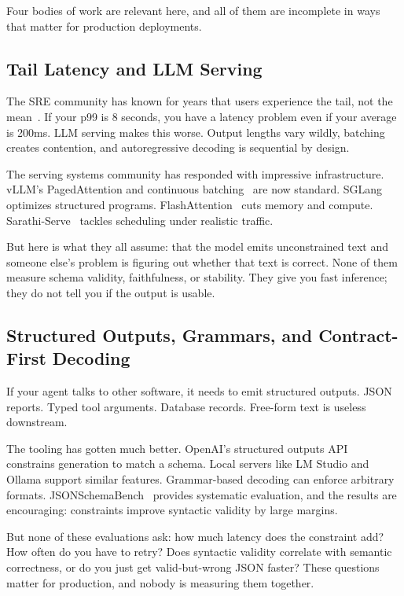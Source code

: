 \documentclass[11pt]{article}
\begin{document}
Four bodies of work are relevant here, and all of them are incomplete in ways that matter for production deployments.

\subsection{Tail Latency and LLM Serving}

The SRE community has known for years that users experience the tail, not the mean~\citep{dean2013tail}.
If your p99 is 8 seconds, you have a latency problem even if your average is 200ms.
LLM serving makes this worse.  Output lengths vary wildly, batching creates contention, and autoregressive decoding is sequential by design.

The serving systems community has responded with impressive infrastructure.
vLLM's PagedAttention and continuous batching~\citep{kwon2023vllm} are now standard.
SGLang~\citep{zheng2023sglang} optimizes structured programs.
FlashAttention~\citep{dao2023flashattention2} cuts memory and compute.
Sarathi-Serve~\citep{agrawal2024sarathi} tackles scheduling under realistic traffic.

But here is what they all assume: that the model emits unconstrained text and someone else's problem is figuring out whether that text is correct.
None of them measure schema validity, faithfulness, or stability.
They give you fast inference; they do not tell you if the output is usable.

\subsection{Structured Outputs, Grammars, and Contract-First Decoding}

If your agent talks to other software, it needs to emit structured outputs.
JSON reports.
Typed tool arguments.
Database records.
Free-form text is useless downstream.

The tooling has gotten much better.
OpenAI's structured outputs API~\citep{openaiStructuredOutputs} constrains generation to match a schema.
Local servers like LM Studio and Ollama support similar features.
Grammar-based decoding can enforce arbitrary formats.
JSONSchemaBench~\citep{geng2025jsonschemabench} provides systematic evaluation, and the results are encouraging: constraints improve syntactic validity by large margins.

But none of these evaluations ask: how much latency does the constraint add?
How often do you have to retry?
Does syntactic validity correlate with semantic correctness, or do you just get valid-but-wrong JSON faster?
These questions matter for production, and nobody is measuring them together.
\end{document}
